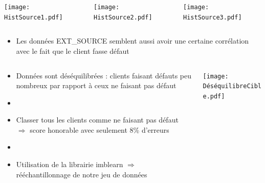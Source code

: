 \documentclass[8pt,aspectratio=169,hyperref={unicode=true}]{beamer}
\begin{document}
\begin{frame}{\insertsection}{\insertsubsection}
    \begin{columns}
        \begin{column}{.33\textwidth}
            \texttt{[image: HistSource1.pdf]}
        \end{column}
        \begin{column}{.33\textwidth}
            \texttt{[image: HistSource2.pdf]}
        \end{column}
        \begin{column}{.33\textwidth}
            \texttt{[image: HistSource3.pdf]}
        \end{column}
    \end{columns}
    \begin{itemize}
        \item Les données EXT\_SOURCE semblent aussi avoir une certaine corrélation avec le fait que le client fasse défaut
    \end{itemize}
\end{frame}

\begin{frame}{\insertsection}{\insertsubsection}
    \begin{columns}
        \begin{column}{.5\textwidth}
            \begin{itemize}
                \item Données sont déséquilibrées : clients faisant défauts peu nombreux par rapport à ceux ne faisant pas défaut
                \item[]
                \item Classer tous les clients comme ne faisant pas défaut \\$\Longrightarrow$ score honorable avec seulement 8\% d'erreurs
                \item[]
                \item Utilisation de la librairie imblearn $\Longrightarrow$ rééchantillonnage de  notre jeu de données
            \end{itemize}
        \end{column}
        \begin{column}{.5\textwidth}
            \texttt{[image: DéséquilibreCible.pdf]}
        \end{column}
    \end{columns}
\end{frame}
\end{document}
